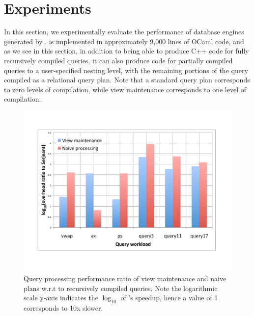 \section{Experiments}

In this section, we experimentally evaluate the performance of database engines
generated by \compiler. \compiler is implemented in approximately 9,000 lines of
OCaml code, and as we see in this section, in addition to being able to produce
C++ code for fully recursively compiled queries, it can also produce code for
partially compiled queries to a user-specified nesting level, with the remaining
portions of the query compiled as a relational query plan. Note that a standard
query plan corresponds to zero levels of compilation, while view maintenance
corresponds to one level of compilation.


\begin{figure}[tb]
\vspace{-6mm}
\hspace{-3mm}\includegraphics[scale=0.33]{figures/cpu-comparison}
\vspace{-13mm}
\caption{Query processing performance ratio of view maintenance and naive plans
  w.r.t to recursively compiled queries. Note the logarithmic scale y-axis
  indicates the $\log_{10}$ of \compiler's speedup, hence a value of 1
  corresponds to 10x  slower.}
\label{fig:cpucomp}
\end{figure}

